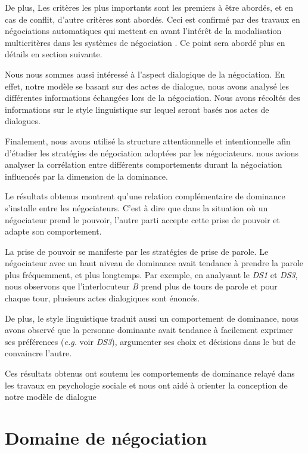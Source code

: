 			De plus, Les critères les plus importants sont les premiers à être abordés, et en cas de conflit, d'autre critères sont abordés. 
			Ceci est confirmé par des travaux en négociations automatiques qui mettent en avant l'intérêt de la modalisation multicritères dans les systèmes de négociation \cite{jonker2007agent,lai2004literature}. Ce point sera abordé plus en détails en section suivante. 
			 
			 Nous nous sommes aussi intéressé à l'aspect dialogique de la négociation. En effet, notre modèle se basant sur des actes de dialogue, nous avons analysé les différentes informations échangées lors de la négociation. 
			 Nous avons récoltés des informations sur le style linguistique sur lequel seront basés nos actes de dialogues.
			 
			 Finalement, nous avons utilisé la structure attentionnelle et intentionnelle afin d'étudier les stratégies de négociation adoptées par les négociateurs. nous avions analyser la corrélation entre différents comportements durant la négociation influencés par la dimension de la dominance.
			 
			 Le résultats obtenus montrent qu'une relation complémentaire de dominance s'installe entre les négociateurs. C'est à dire que dans la situation où un négociateur prend le pouvoir, l'autre parti accepte cette prise de pouvoir et adapte son comportement.
		
			 La prise de pouvoir se manifeste par les stratégies de prise de parole. Le négociateur avec un haut niveau de dominance avait tendance à prendre la parole plus fréquemment, et plus longtemps. Par exemple, en analysant le \emph{DS1} et \emph{DS3}, nous observons que l'interlocuteur \textit{B} prend plus de tours de parole et pour chaque tour, plusieurs actes dialogiques sont énoncés. 
			 
			 
			 De plus, le style linguistique traduit aussi un comportement de dominance, nous avons observé que la personne dominante avait tendance à facilement exprimer ses préférences (\emph{e.g.} voir \emph{DS3}), argumenter ses choix et décisions dans le but de convaincre l'autre. 
			 
			Ces résultats obtenus ont soutenu les comportements de dominance relayé dans les travaux en psychologie sociale et nous ont aidé à orienter la conception de notre modèle de dialogue
			
		
	
	\section{Domaine de négociation}
	\label{domaine}
	
